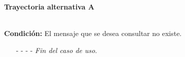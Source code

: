\hypertarget{CU9-4:TAA}{\textbf{Trayectoria alternativa A}}\\
\noindent \textbf{Condición:} El mensaje que se desea consultar no existe.
\begin{enumerate}
	\UCpaso[\UCsist] Muestra el mensaje  en la pantalla .
	\item[- -] - - {\em {Fin del caso de uso}}.
\end{enumerate}

	
